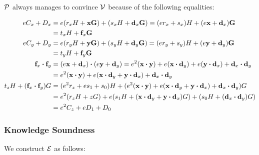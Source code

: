$\mathcal{P}$ always manages to convince $\mathcal{V}$ because of the following equalities:

\begin{align*}
    eC_x + D_x &= e(r_xH + \mathbf{x}\mathbf{G}) + (s_xH + \mathbf{d}_x\mathbf{G}) = (er_x + s_x)H + (e\mathbf{x} + \mathbf{d}_x)\mathbf{G} \\
    &= t_xH + \mathbf{f}_x\mathbf{G} \\
    eC_y + D_y &= e(r_yH + \mathbf{y}\mathbf{G}) + (s_yH + \mathbf{d}_y\mathbf{G}) = (er_y + s_y)H + (e\mathbf{y} + \mathbf{d}_y)\mathbf{G} \\
    &= t_yH + \mathbf{f}_y\mathbf{G} \\
    \mathbf{f}_x \boldsymbol{\cdot} \mathbf{f}_y &= (e\mathbf{x} + \mathbf{d}_x) \boldsymbol{\cdot} (e\mathbf{y} + \mathbf{d}_y) = e^2 (\mathbf{x} \boldsymbol{\cdot} \mathbf{y}) + e(\mathbf{x} \boldsymbol{\cdot} \mathbf{d}_y) + e(\mathbf{y} \boldsymbol{\cdot} \mathbf{d}_x) + \mathbf{d}_x \boldsymbol{\cdot} \mathbf{d}_y \\
    &= e^2 (\mathbf{x} \boldsymbol{\cdot} \mathbf{y}) + e(\mathbf{x} \boldsymbol{\cdot} \mathbf{d}_y + \mathbf{y} \boldsymbol{\cdot} \mathbf{d}_x) + \mathbf{d}_x \boldsymbol{\cdot} \mathbf{d}_y \\
    t_zH + (\mathbf{f}_x \boldsymbol{\cdot} \mathbf{f}_y)G &= (e^2 r_z + es_1 + s_0)H + (e^2 (\mathbf{x} \boldsymbol{\cdot} \mathbf{y}) + e(\mathbf{x} \boldsymbol{\cdot} \mathbf{d}_y + \mathbf{y} \boldsymbol{\cdot} \mathbf{d}_x) + \mathbf{d}_x \boldsymbol{\cdot} \mathbf{d}_y)G \\
    &= e^2 (r_zH + zG) + e(s_1H + (\mathbf{x} \boldsymbol{\cdot} \mathbf{d}_y + \mathbf{y} \boldsymbol{\cdot} \mathbf{d}_x)G) + (s_0H + (\mathbf{d}_x \boldsymbol{\cdot} \mathbf{d}_y)G) \\
    &= e^2 C_z + eD_1 + D_0
\end{align*}

\subsubsection{Knowledge Soundness}

We construct $\mathcal{E}$ as follows:

